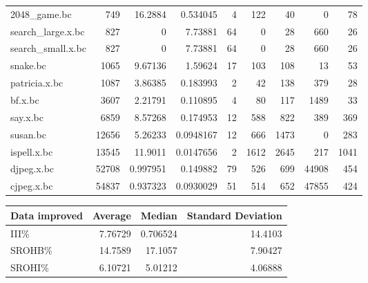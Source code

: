 \begin{tabular}{lrrrrrrrr}
 2048\_game.bc         &            749 & 16.2884   &  0.534045  &    4 &    122 &           40 &     0 &    78 \\
 search\_large.x.bc    &            827 &  0        &  7.73881   &   64 &      0 &           28 &   660 &    26 \\
 search\_small.x.bc    &            827 &  0        &  7.73881   &   64 &      0 &           28 &   660 &    26 \\
 snake.bc             &           1065 &  9.67136  &  1.59624   &   17 &    103 &          108 &    13 &    53 \\
 patricia.x.bc        &           1087 &  3.86385  &  0.183993  &    2 &     42 &          138 &   379 &    28 \\
 bf.x.bc              &           3607 &  2.21791  &  0.110895  &    4 &     80 &          117 &  1489 &    33 \\
 say.x.bc             &           6859 &  8.57268  &  0.174953  &   12 &    588 &          822 &   389 &   369 \\
 susan.bc             &          12656 &  5.26233  &  0.0948167 &   12 &    666 &         1473 &     0 &   283 \\
 ispell.x.bc          &          13545 & 11.9011   &  0.0147656 &    2 &   1612 &         2645 &   217 &  1041 \\
 djpeg.x.bc           &          52708 &  0.997951 &  0.149882  &   79 &    526 &          699 & 44908 &   454 \\
 cjpeg.x.bc           &          54837 &  0.937323 &  0.0930029 &   51 &    514 &          652 & 47855 &   424 \\
\hline
\end{tabular}\begin{tabular}{lrrr}
\hline
 Data improved   &   Average &    Median &   Standard Deviation \\
\hline
 III\%            &   7.76729 &  0.706524 &             14.4103  \\
 SROHB\%          &  14.7589  & 17.1057   &              7.90427 \\
 SROHI\%          &   6.10721 &  5.01212  &              4.06888 \\
\hline
\end{tabular}